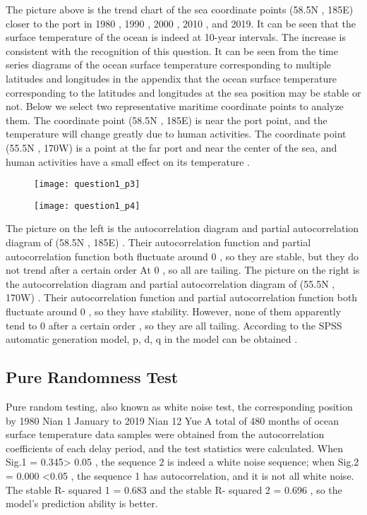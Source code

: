 \documentclass{mcmthesis}
\begin{document}
The picture above is the trend chart of the sea coordinate points (58.5N , 185E) closer to the port in 1980 , 1990 , 2000 , 2010 , and 2019. It can be seen that the surface temperature of the ocean is indeed at 10-year intervals. The increase is consistent with the recognition of this question. It can be seen from the time series diagrams of the ocean surface temperature corresponding to multiple latitudes and longitudes in the appendix that the ocean surface temperature corresponding to the latitudes and longitudes at the sea position may be stable or not. Below we select two representative maritime coordinate points to analyze them. The coordinate point (58.5N , 185E) is near the port point, and the temperature will change greatly due to human activities. The coordinate point (55.5N , 170W) is a point at the far port and near the center of the sea, and human activities have a small effect on its temperature .

\begin{figure}[h]
	\small
	\centering
	\texttt{[image: question1\_p3]}
	 \label{fig:aa}
\end{figure}

\begin{figure}[h]
	\small
	\centering
	\texttt{[image: question1\_p4]}
	\label{fig:aa}
\end{figure}

The picture on the left is the autocorrelation diagram and partial autocorrelation diagram of (58.5N , 185E) . Their autocorrelation function and partial autocorrelation function both fluctuate around 0 , so they are stable, but they do not trend after a certain order At 0 , so all are tailing. The picture on the right is the autocorrelation diagram and partial autocorrelation diagram of (55.5N , 170W) . Their autocorrelation function and partial autocorrelation function both fluctuate around 0 , so they have stability. However, none of them apparently tend to 0 after a certain order , so they are all tailing. According to the SPSS automatic generation model, p, d, q in the model can be obtained . 

\subsection{Pure Randomness Test}
Pure random testing, also known as white noise test, the corresponding position by 1980 Nian 1 January to 2019 Nian 12 Yue A total of 480 months of ocean surface temperature data samples were obtained from the autocorrelation coefficients of each delay period, and the test statistics were calculated. When Sig.1 = 0.345> 0.05 , the sequence 2 is indeed a white noise sequence; when Sig.2 = 0.000 <0.05 , the sequence 1 has autocorrelation, and it is not all white noise. The stable R- squared 1 = 0.683 and the stable R- squared 2 = 0.696 , so the model's prediction ability is better. 
\end{document}
